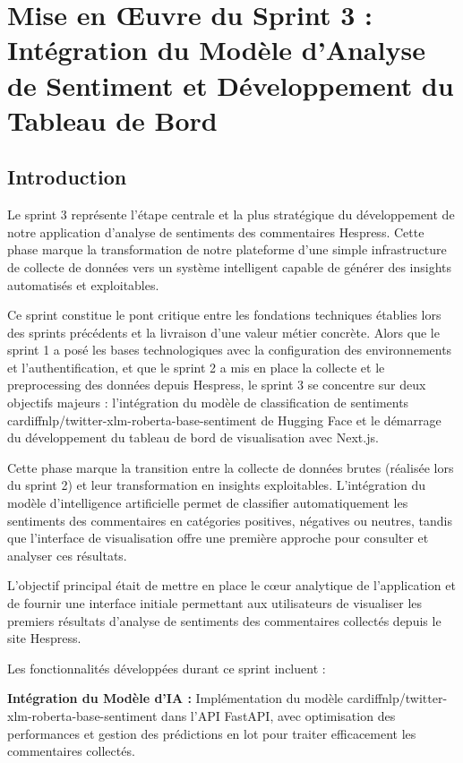 \chapter{Mise en Œuvre du Sprint 3 : Intégration du Modèle d'Analyse de Sentiment et Développement du Tableau de Bord}

\section{Introduction}

Le sprint 3 représente l'étape centrale et la plus stratégique du développement de notre application d'analyse de sentiments des commentaires Hespress. Cette phase marque la transformation de notre plateforme d'une simple infrastructure de collecte de données vers un système intelligent capable de générer des insights automatisés et exploitables.

Ce sprint constitue le pont critique entre les fondations techniques établies lors des sprints précédents et la livraison d'une valeur métier concrète. Alors que le sprint 1 a posé les bases technologiques avec la configuration des environnements et l'authentification, et que le sprint 2 a mis en place la collecte et le preprocessing des données depuis Hespress, le sprint 3 se concentre sur deux objectifs majeurs : l'intégration du modèle de classification de sentiments cardiffnlp/twitter-xlm-roberta-base-sentiment de Hugging Face et le démarrage du développement du tableau de bord de visualisation avec Next.js.

Cette phase marque la transition entre la collecte de données brutes (réalisée lors du sprint 2) et leur transformation en insights exploitables. L'intégration du modèle d'intelligence artificielle permet de classifier automatiquement les sentiments des commentaires en catégories positives, négatives ou neutres, tandis que l'interface de visualisation offre une première approche pour consulter et analyser ces résultats.

L'objectif principal était de mettre en place le cœur analytique de l'application et de fournir une interface initiale permettant aux utilisateurs de visualiser les premiers résultats d'analyse de sentiments des commentaires collectés depuis le site Hespress.

Les fonctionnalités développées durant ce sprint incluent :

\textbf{Intégration du Modèle d'IA :} Implémentation du modèle cardiffnlp/twitter-xlm-roberta-base-sentiment dans l'API FastAPI, avec optimisation des performances et gestion des prédictions en lot pour traiter efficacement les commentaires collectés.

